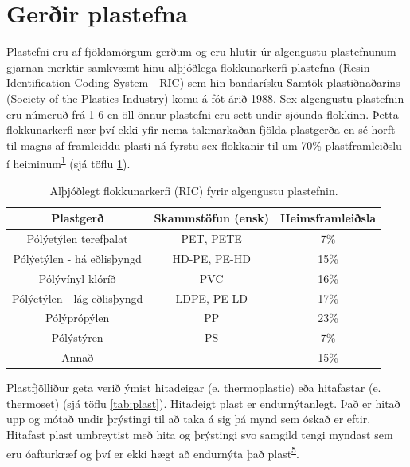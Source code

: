 \documentclass[icelandic,]{book}
\begin{document}
\hypertarget{gerir-plastefna}{%
\section*{Gerðir plastefna}\label{gerir-plastefna}}

Plastefni eru af fjöldamörgum gerðum og eru hlutir úr algengustu plastefnunum gjarnan merktir samkvæmt hinu alþjóðlega flokkunarkerfi plastefna (Resin Identification Coding System - RIC) sem hin bandarísku Samtök plastiðnaðarins (Society of the Plastics Industry) komu á fót árið 1988. Sex algengustu plastefnin eru númeruð frá 1-6 en öll önnur plastefni eru sett undir sjöunda flokkinn. Þetta flokkunarkerfi nær því ekki yfir nema takmarkaðan fjölda plastgerða en sé horft til magns af framleiddu plasti ná fyrstu sex flokkanir til um 70\% plastframleiðslu í heiminum\textsuperscript{\protect\hyperlink{ref-geyer2017production}{1}} (sjá töflu \ref{tab:framleidsla}).

\begin{table}[t]

\caption{\label{tab:framleidsla}Alþjóðlegt flokkunarkerfi (RIC) fyrir algengustu plastefnin.}
\centering
\begin{tabular}{ccc}
\toprule
Plastgerð & Skammstöfun (ensk) & Heimsframleiðsla\\
\midrule
Pólýetýlen terefþalat & PET, PETE & 7\%\\
Pólýetýlen - há eðlisþyngd & HD-PE, PE-HD & 15\%\\
Pólývínyl klóríð & PVC & 16\%\\
Pólýetýlen - lág eðlisþyngd & LDPE, PE-LD & 17\%\\
Pólýprópýlen & PP & 23\%\\
\addlinespace
Pólýstýren & PS & 7\%\\
Annað &  & 15\%\\
\bottomrule
\end{tabular}
\end{table}

Plastfjölliður geta verið ýmist hitadeigar (e. thermoplastic) eða hitafastar (e. thermoset) (sjá töflu \ref{tab:plast}). Hitadeigt plast er endurnýtanlegt. Það er hitað upp og mótað undir þrýstingi til að taka á sig þá mynd sem óskað er eftir. Hitafast plast umbreytist með hita og þrýstingi svo samgild tengi myndast sem eru óafturkræf og því er ekki hægt að endurnýta það plast\textsuperscript{\protect\hyperlink{ref-OECD2009}{5}}.
\end{document}
